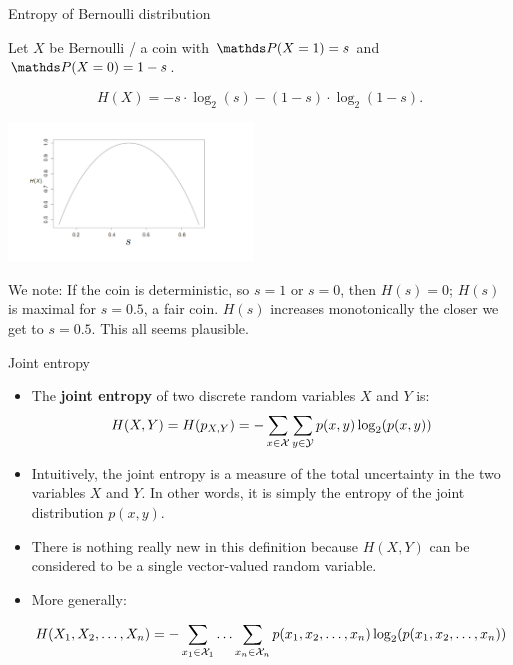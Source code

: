 \documentclass[11pt,compress,t,notes=noshow, xcolor=table]{beamer}
\begin{document}
\begin{vbframe}{Entropy of Bernoulli distribution}

Let $X$ be Bernoulli / a coin with $\P(X=1) = s$ and $\P(X=0) = 1 - s$.

$$ H(X)= -s \cdot \log_2(s)-(1-s)\cdot \log_2(1-s). $$

\begin{center}
\includegraphics[width = 6.5cm ]{figure_man/coin-entropy.png} \\
\end{center}

We note: If the coin is deterministic, so $s=1$ or $s=0$, then $H(s)=0$; 
$H(s)$ is maximal for $s = 0.5$, a fair coin. 
$H(s)$ increases monotonically the closer we get to $s=0.5$.
This all seems plausible.

\end{vbframe}

\begin{vbframe} {Joint entropy}
\begin{itemize}
  \item The \textbf{joint entropy} of two discrete random variables $X$ and $Y$ is:
    $$ H(X,Y) = H(p_{X,Y}) = - \sum_{x \in \mathcal{X}} \sum_{y \in \mathcal{Y}}  p(x,y) \log_2(p(x,y))$$
  \item Intuitively, the joint entropy is a measure of the total uncertainty in the two variables $X$ and $Y$. In other words, it is simply the entropy of the joint distribution $p(x,y)$.
  \item There is nothing really new in this definition because $H(X, Y)$ can be considered to be a single vector-valued random variable.
  \item More generally:
    \begin{footnotesize}  
  $$ H(X_1, X_2, \ldots, X_n) = - \sum_{x_1 \in \mathcal{X}_1} \ldots \sum_{x_n \in \mathcal{X}_n} p(x_1,x_2, \ldots, x_n) \log_2(p(x_1,x_2, \ldots, x_n)) $$ 
    \end{footnotesize}  
\end{itemize}
\end{vbframe}
\end{document}

